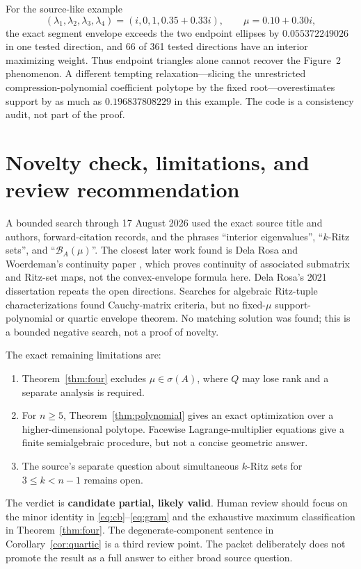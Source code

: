 \documentclass[11pt]{article}
\newcommand{\spec}{\sigma}
\newcommand{\cB}{\mathcal B}
\numberwithin{equation}{section}
\theoremstyle{definition}
\begin{document}
For the source-like example
\[
 (\lambda_1,\lambda_2,\lambda_3,\lambda_4)
 =(i,0,1,0.35+0.33i),\qquad \mu=0.10+0.30i,
\]
the exact segment envelope exceeds the two endpoint ellipses by
$0.055372249026$ in one tested direction, and 66 of 361 tested directions
have an interior maximizing weight.  Thus endpoint triangles alone cannot
recover the Figure~2 phenomenon.  A different tempting relaxation---slicing
the unrestricted compression-polynomial coefficient polytope by the fixed
root---overestimates support by as much as $0.196837808229$ in this example.
The code is a consistency audit, not part of the proof.

\section{Novelty check, limitations, and review recommendation}

A bounded search through 17 August 2026 used the exact source title and
authors, forward-citation records, and the phrases ``interior eigenvalues'',
``$k$-Ritz sets'', and ``$\cB_A(\mu)$''.  The closest later work found is Dela
Rosa and Woerdeman's continuity paper \cite{DRW-continuity}, which proves
continuity of associated submatrix and Ritz-set maps, not the convex-envelope
formula here.  Dela Rosa's 2021 dissertation repeats the open directions.
Searches for algebraic Ritz-tuple characterizations found Cauchy-matrix
criteria, but no fixed-$\mu$ support-polynomial or quartic envelope theorem.
No matching solution was found; this is a bounded negative search, not a proof
of novelty.

The exact remaining limitations are:
\begin{enumerate}[leftmargin=2em]
\item Theorem~\ref{thm:four} excludes $\mu\in\spec(A)$, where $Q$ may lose
rank and a separate analysis is required.
\item For $n\geq5$, Theorem~\ref{thm:polynomial} gives an exact optimization
over a higher-dimensional polytope.  Facewise Lagrange-multiplier equations
give a finite semialgebraic procedure, but not a concise geometric answer.
\item The source's separate question about simultaneous $k$-Ritz sets for
$3\leq k<n-1$ remains open.
\end{enumerate}

The verdict is \textbf{candidate partial, likely valid}.  Human review should
focus on the minor identity in \eqref{eq:cb}--\eqref{eq:gram} and the exhaustive maximum
classification in Theorem~\ref{thm:four}.  The degenerate-component sentence
in Corollary~\ref{cor:quartic} is a third review point.  The packet deliberately
does not promote the result as a full answer to either broad source question.
\end{document}
